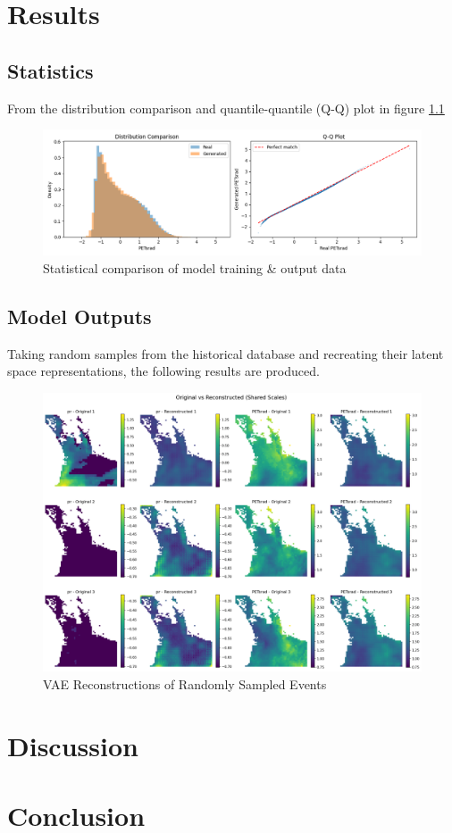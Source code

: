 \chapter{Results}

\section{Statistics}

From the distribution comparison and quantile-quantile (Q-Q) plot in figure 
\ref{fig:statistics}

\begin{figure}[h!]
    \centering
    \includegraphics[scale=0.5]{figures/Stats.png}
    \caption{Statistical comparison of model training \& output data}
    \label{fig:statistics}
\end{figure}

\section{Model Outputs}

Taking random samples from the historical database and recreating their latent 
space representations, the following results are produced.

\begin{figure}[h!]
    \centering
    \includegraphics[scale=0.35]{figures/reconstruction_comparison.png}
    \caption{VAE Reconstructions of Randomly Sampled Events}
    \label{fig:reconstructions}
\end{figure}

\chapter{Discussion}

\chapter{Conclusion}

